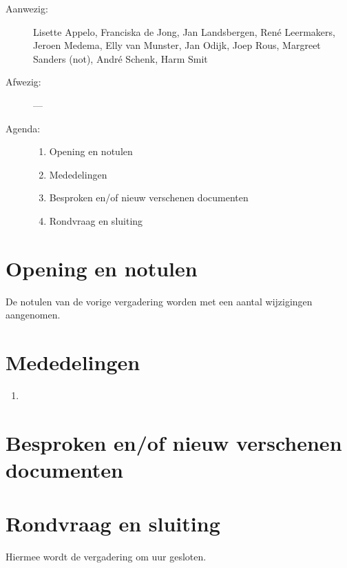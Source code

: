 

   \RosSupersedes{-}
   \MakeRosTitle
%
%
\begin{description}
\item[Aanwezig:] Lisette Appelo, Franciska de Jong, 
                 Jan Landsbergen, Ren\'{e} Leermakers, 
                 Jeroen Medema, Elly van Munster, 
                 Jan Odijk, Joep Rous, Margreet Sanders (not),
                 Andr\'{e} Schenk, Harm Smit
\item[Afwezig:]  ---
\item[Agenda:]\mbox{}
  \begin{enumerate}
  \item Opening en notulen
  \item Mededelingen
  \item Besproken en/of nieuw verschenen documenten
  \item Rondvraag en sluiting
  \end{enumerate}
\end{description}

\section{Opening en notulen}
De notulen van de vorige vergadering worden met een aantal wijzigingen 
aangenomen.

\section{Mededelingen}
\begin{enumerate}
  \item
\end{enumerate}

\section{Besproken en/of nieuw verschenen documenten}
\begin{description}
\item [Besproken:}\mbox{}
  \begin{itemize}
  \item
  \end{itemize}
\item [Verschenen:}\mbox{}
  \begin{itemize}
  \item
  \end{itemize}
\end{description}

\section{Rondvraag en sluiting}
{\bf  }


Hiermee wordt de vergadering om uur gesloten.

